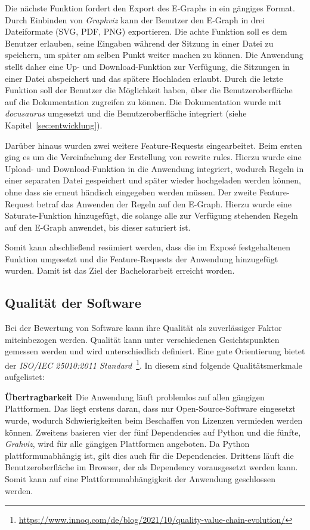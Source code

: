Die nächste Funktion fordert den Export des E-Graphs in ein gängiges Format. Durch Einbinden von \textit{Graphviz} kann der Benutzer den E-Graph in drei Dateiformate (SVG, PDF, PNG) exportieren.
Die achte Funktion soll es dem Benutzer erlauben, seine Eingaben während der Sitzung in einer Datei zu speichern, um später am selben Punkt weiter machen zu können.
Die Anwendung stellt daher eine Up- und Download-Funktion zur Verfügung, die Sitzungen in einer Datei abspeichert und das spätere Hochladen erlaubt.
Durch die letzte Funktion soll der Benutzer die Möglichkeit haben, über die Benutzeroberfläche auf die Dokumentation zugreifen zu können. Die Dokumentation wurde mit \textit{docusaurus}
umgesetzt und die Benutzeroberfläche integriert (siehe Kapitel~\ref{sec:entwicklung}).

Darüber hinaus wurden zwei weitere Feature-Requests eingearbeitet. 
Beim ersten ging es um die Vereinfachung der Erstellung von rewrite rules. Hierzu wurde eine Upload- und Download-Funktion in die Anwendung integriert, wodurch
Regeln in einer separaten Datei gespeichert und später wieder hochgeladen werden können, ohne dass sie erneut händisch eingegeben werden müssen.
Der zweite Feature-Request betraf das Anwenden der Regeln auf den E-Graph. Hierzu wurde eine Saturate-Funktion hinzugefügt, die solange alle zur Verfügung stehenden
Regeln auf den E-Graph anwendet, bis dieser saturiert ist.

Somit kann abschließend resümiert werden, dass die im Exposé festgehaltenen Funktion umgesetzt und die Feature-Requests der Anwendung hinzugefügt wurden.
Damit ist das Ziel der Bachelorarbeit erreicht worden.

\subsection{Qualität der Software}\label{softwarequalität}

Bei der Bewertung von Software kann ihre Qualität als zuverlässiger Faktor miteinbezogen werden. Qualität kann unter verschiedenen Gesichtspunkten gemessen werden und wird
unterschiedlich definiert. Eine gute Orientierung bietet der \textit{ISO/IEC 25010:2011 Standard}~\footnote{\hspace{1.5mm}\url{https://www.innoq.com/de/blog/2021/10/quality-value-chain-evolution/}}. 
In diesem sind folgende Qualitätsmerkmale aufgelistet:

\noindent\textbf{Übertragbarkeit} Die Anwendung läuft problemlos auf allen gängigen Plattformen. Das liegt erstens daran, dass nur Open-Source-Software eingesetzt wurde,
wodurch Schwierigkeiten beim Beschaffen von Lizenzen vermieden werden können. 
Zweitens basieren vier der fünf Dependencies auf Python und die fünfte, \textit{Grahviz}, wird für alle gängigen Plattformen angeboten. Da Python plattformunabhängig ist, gilt dies auch
für die Dependencies.
Drittens läuft die Benutzeroberfläche im Browser, der als Dependency vorausgesetzt werden kann.
Somit kann auf eine Plattformunabhängigkeit der Anwendung geschlossen werden.

